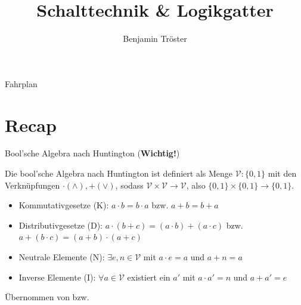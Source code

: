 \documentclass[12pt%
,aspectratio=169%
]{beamer}
\author{Benjamin Tröster}
\title[Schalttechnik \& Logikgatter]{Schalttechnik \& Logikgatter}
\institute[HTW Berlin]{Hochschule für Technik und Wirtschaft Berlin}
\begin{document}
\begin{frame}
\titlepage
\end{frame}

\begin{frame}{Fahrplan}
\tableofcontents[hideothersubsections]
\end{frame}

\section{Recap}
\begin{frame}{Bool'sche Algebra nach Huntington (\textbf{Wichtig!})}
\begin{definition}
Die bool'sche Algebra nach Huntington ist definiert als Menge $\mathcal{V}: \{0,1\}$ mit den Verknüpfungen $\cdot (\land), + (\lor)$, sodass $\mathcal{V} \times \mathcal{V} \to \mathcal{V}$, also $\{0,1\} \times \{0,1\} \to \{0,1\}$. 
\end{definition}
\begin{itemize}
	\item Kommutativgesetze (K): $a \cdot b = b \cdot a$ bzw. $a + b = b + a$
	\item Distributivgesetze (D): $a \cdot (b + c) = (a \cdot b) + (a \cdot c)$ bzw. $a + (b \cdot c) = (a + b) \cdot (a + c)$
	\item Neutrale Elemente (N): $ \exists e, n \in \mathcal{V}$ mit  $a \cdot e = a$ und $a + n = a$
	\item Inverse Elemente (I): $\forall a \in \mathcal{V}$ existiert ein $a'$ mit $a \cdot a'= n$ und $a + a' = e$
\end{itemize}
Übernommen von \cite{barnett2013boolean} bzw. \cite{hoffmann2020grundlagen}
\end{frame}
\end{document}
